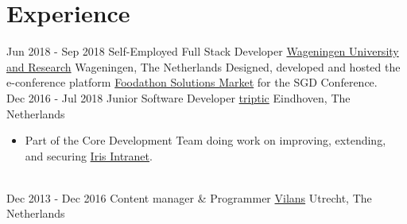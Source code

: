 \documentclass[letterpaper]{twentysecondcv} %
\begin{document}

\section{Experience}
\begin{twenty} %
    \twentyitem
    	{Jun 2018 -}
		{Sep 2018}
        {Self-Employed Full Stack Developer}
		{\href{https://wur.nl}{Wageningen University and Research}}
        {Wageningen, The Netherlands}
        {
        Designed, developed and hosted the e-conference platform \href{https://foodathon-solutionsmarket.com/}{Foodathon Solutions Market} for the SGD Conference.
        }
        \\
    \twentyitem
    	{Dec 2016 -}
		{Jul 2018}
        {Junior Software Developer}
		{\href{http://triptic.nl}{triptic}}
        {Eindhoven, The Netherlands}
        {\begin{itemize}
        \item Part of the Core Development Team doing work on improving, extending, and securing \href{https://www.irisintranet.com/}{Iris Intranet}.
        \end{itemize}}
        \\
	\twentyitem
    	{Dec 2013 -}
		{Dec 2016}
		{Content manager \& Programmer}
		{\href{http://www.vilans.nl/}{Vilans}}
        {Utrecht, The Netherlands}
        {}
\end{twenty}

\end{document}
